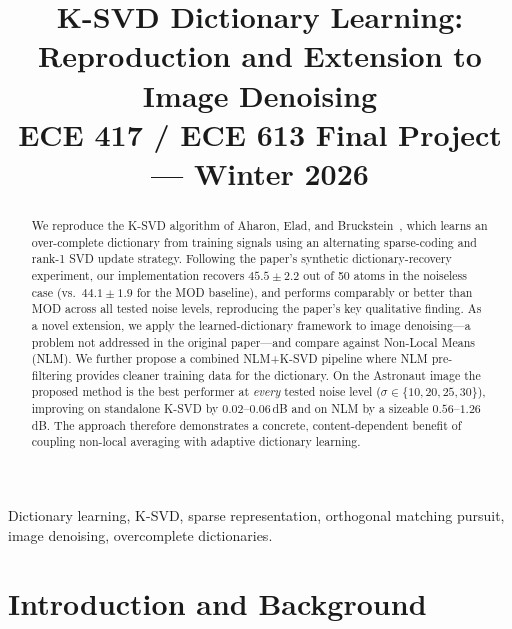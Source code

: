 \documentclass[conference]{IEEEtran}
\begin{document}
\title{K-SVD Dictionary Learning: Reproduction and Extension
       to Image Denoising\\
{\large ECE 417 / ECE 613 Final Project --- Winter 2026}}
\author{
}
\maketitle

\begin{abstract}
We reproduce the K-SVD algorithm of Aharon, Elad, and
Bruckstein~\cite{aharon2006ksvd}, which learns an over-complete
dictionary from training signals using an alternating sparse-coding
and rank-1 SVD update strategy.
Following the paper's synthetic dictionary-recovery experiment,
our implementation recovers $45.5\pm2.2$ out of 50 atoms in the
noiseless case (vs.\ $44.1\pm1.9$ for the MOD baseline), and
performs comparably or better than MOD across all tested noise
levels, reproducing the paper's key qualitative finding.
As a novel extension, we apply the learned-dictionary framework
to image denoising---a problem not addressed in the original
paper---and compare against Non-Local Means (NLM).
We further propose a combined NLM+K-SVD pipeline where NLM
pre-filtering provides cleaner training data for the
dictionary.  On the Astronaut image the proposed method is
the best performer at \emph{every} tested noise level
($\sigma\!\in\!\{10,20,25,30\}$), improving on standalone
K-SVD by $0.02$--$0.06$\,dB and on NLM by a sizeable
$0.56$--$1.26$\,dB.  The approach therefore demonstrates a
concrete, content-dependent benefit of coupling non-local
averaging with adaptive dictionary learning.
\end{abstract}

\begin{IEEEkeywords}
Dictionary learning, K-SVD, sparse representation, orthogonal
matching pursuit, image denoising, overcomplete dictionaries.
\end{IEEEkeywords}

\section{Introduction and Background}
\end{document}
